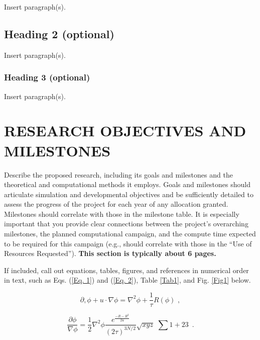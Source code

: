 \documentclass[11pt,letterpaper,english]{article}
\begin{document}
Insert paragraph(s).
\vspace{-.25in}
\subsection{Heading 2 (optional)}
\vspace{-.2in}

Insert paragraph(s).

\vspace{-.25in}
\subsubsection{Heading 3 (optional)}
\vspace{-.2in}

Insert paragraph(s).

\vspace{-.25in}
\section{RESEARCH OBJECTIVES AND MILESTONES }  
\vspace{-.2in}
Describe the proposed research, including its goals and milestones and the theoretical and computational methods it employs. Goals and milestones should articulate simulation and developmental objectives and be sufficiently detailed to assess the progress of the project for each year of any allocation granted. Milestones should correlate with those in the milestone table. It is especially important that you provide clear connections between the project's overarching milestones, the planned computational campaign, and the compute time expected to be required for this campaign (e.g., should correlate with those in the ``Use of Resources Requested''). {\bf This section is typically about 6 pages.}

If included, call out equations, tables, figures, and references in numerical order in text, such as Eqs. (\ref{Eq. 1}) and (\ref{Eq. 2}), Table \ref{Tab1}, and Fig. \ref{Fig1} below.

\vspace{-.15in}
\begin{equation} \label{Eq. 1} 
\partial ,\phi +u\cdot \nabla \phi =\nabla ^{2} \phi +\frac{1}{\tau } R\left(\phi \right)\, \, ,
\end{equation} 

\vspace{-.15in}
\begin{equation} \label{Eq. 2} 
\frac{\partial \phi }{\nabla \phi } =\frac{1}{2} \nabla ^{2} \phi \frac{e^{\frac{-R-R^{2} }{2u} } }{\left(2\tau \right)^{3N/2} } \sqrt{xyz} \, \, \sum 1+23\, \, \, . 
\end{equation} 
\end{document}
